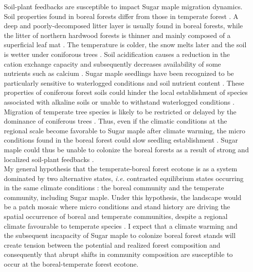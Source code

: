 Soil-plant feedbacks are susceptible to impact Sugar maple migration dynamics.
Soil properties found in boreal forests differ from those in temperate forest
\cite{Lafleur2010,Barras1998,Goldblum2010,Demers1998}. A deep and poorly-decomposed 
litter layer is usually found in boreal forests, while the litter
of  northern hardwood forests is thinner and mainly composed of a superficial
leaf mat \cite{Barras1998}. The temperature is colder, the snow melts later
and the soil is wetter under coniforous trees \cite{Lafleur2010,Goldblum2010}.
Soil acidification causes a reduction in the cation exchange capacity and
subsequently decreases availability of some nutrients such as calcium
\cite{Moore2008}. Sugar maple seedlings have been recognized to be
particularly sensitive to waterlogged conditions and soil nutrient content
\cite{Moore2008,Lafleur2010,Cleavitt2011}. These properties of coniferous
forest soils could hinder the local establishment of species associated with
alkaline soils or unable to withstand waterlogged conditions
\cite{Lafleur2010}. Migration of temperate tree species is likely to be
restricted or delayed by the dominance of coniferous trees \cite{Lafleur2010}.
Thus, even if the climatic conditions at the regional scale become favorable
to Sugar maple after climate warming, the micro conditions found in the boreal
forest could slow seedling establishment
\cite{Kellman2004,Moore2008,Barras1998,Messier2011}. Sugar maple could thus be
unable to colonize the boreal forests as a result of strong and localized
soil-plant feedbacks \cite{McCarthyNeumann2012}.\\

My general hypothesis that the temperate-boreal forest ecotone is as a system
dominated by two alternative states, \textit{i.e.} contrasted equilibrium
states occurring in the same climate conditions \cite{scheffer2009critical}:
the boreal community and the temperate community, including Sugar maple. Under
this hypothesis, the landscape would be a patch mosaic where micro conditions
and stand history are driving the spatial occurrence of boreal and temperate
communities, despite a regional climate favourable to temperate species
\cite{Goldblum2010,Fisichelli2013}. I expect that a climate warming and the
subsequent incapacity of Sugar maple to colonize boreal forest stands will
create  tension between the potential and realized forest composition and
consequently that abrupt shifts in community composition are susceptible to
occur at the boreal-temperate forest ecotone.\\

